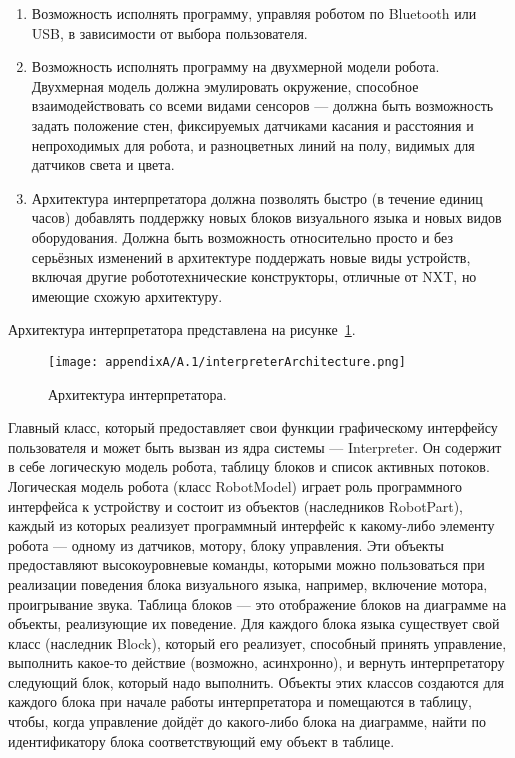 \begin{enumerate}
	\item Возможность исполнять программу, управляя роботом по Bluetooth или USB, в 
		зависимости от выбора пользователя.
	\item Возможность исполнять программу на двухмерной модели робота. Двухмерная модель 
		должна эмулировать окружение, способное взаимодействовать со всеми видами сенсоров 
		--- должна быть возможность задать положение стен, фиксируемых датчиками касания 
		и расстояния и непроходимых для робота, и разноцветных линий на полу, видимых 
		для датчиков света и цвета.
	\item Архитектура интерпретатора должна позволять быстро (в течение единиц часов) 
		добавлять поддержку новых блоков визуального языка и новых видов оборудования. 
		Должна быть возможность относительно просто и без серьёзных изменений в архитектуре 
		поддержать новые виды устройств, включая другие робототехнические конструкторы, 
		отличные от NXT, но имеющие схожую архитектуру.
\end{enumerate}

Архитектура интерпретатора представлена на рисунке~\ref{image:interpreterArchitecture}.

\begin{figure} [ht]
	\begin{center}
		\texttt{[image: appendixA/A.1/interpreterArchitecture.png]}
		\caption{Архитектура интерпретатора.}
		\label{image:interpreterArchitecture}
	\end{center}
\end{figure}

Главный класс, который предоставляет свои функции графическому интерфейсу пользователя 
и может быть вызван из ядра системы --- Interpreter. Он содержит в себе логическую 
модель робота, таблицу блоков и список активных потоков. Логическая модель робота 
(класс RobotModel) играет роль программного интерфейса к устройству и состоит из 
объектов (наследников RobotPart), каждый из которых реализует программный интерфейс 
к какому-либо элементу робота --- одному из датчиков, мотору, блоку управления. Эти 
объекты предоставляют высокоуровневые команды, которыми можно пользоваться при реализации 
поведения блока визуального языка, например, включение мотора, проигрывание звука. 
Таблица блоков --- это отображение блоков на диаграмме на объекты, реализующие их 
поведение. Для каждого блока языка существует свой класс (наследник Block), который 
его реализует, способный принять управление, выполнить какое-то действие (возможно, 
асинхронно), и вернуть интерпретатору следующий блок, который надо выполнить. Объекты 
этих классов создаются для каждого блока при начале работы интерпретатора и помещаются 
в таблицу, чтобы, когда управление дойдёт до какого-либо блока на диаграмме, найти 
по идентификатору блока соответствующий ему объект в таблице.

